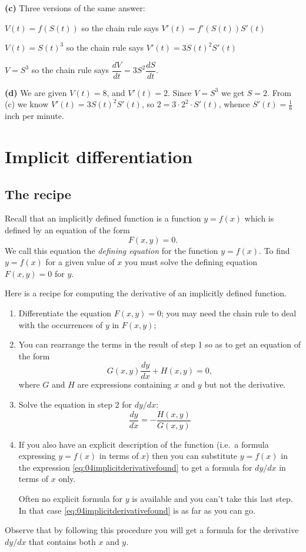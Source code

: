 \begin{multicols}{2}
\textbf{(c)} Three versions of the same answer:

$V(t) = f(S(t))$ so the chain rule says $V'(t) = f'(S(t)) S'(t)$

$V(t) = S(t)^3$ so the chain rule says $V'(t) = 3S(t)^2 S'(t)$

$V=S^3$ so the chain rule says $\dfrac{dV}{dt} =
3S^2\dfrac{dS}{dt}$.

\textbf{(d)} We are given $V(t) = 8$, and $V'(t)=2$.  Since $V=S^3$
we get $S=2$.  From (c) we know $V'(t)=3S(t)^2 S'(t)$, so $2 =
3\cdot 2^2\cdot S'(t)$, whence $S'(t) = \frac16$ inch per minute.
\endanswer
\end{multicols}
\noproblemfont

\section{Implicit differentiation}
\label{sec:implicit-differentiation}
\subsection{The recipe}
Recall that an implicitly defined function is a function $y=f(x)$
which is defined by an equation of the form
\[
F(x, y) = 0.
\]
We call this equation the \emph{defining equation} for the function
$y=f(x)$.  To find $y=f(x)$ for a given value of $x$ you must solve
the defining equation $F(x, y)=0$ for $y$.

Here is a recipe for computing the derivative of an implicitly defined
function.
\begin{enumerate}
\item Differentiate the equation $F(x, y)=0$; you may need the chain
  rule to deal with the occurrences of $y$ in $F(x, y)$;

\item You can rearrange the terms in the result of step 1 so as to get
  an equation of the form
  \begin{equation}\label{eq:04imp-deriv-step2}
    G(x, y)\dfrac{dy}{dx}+H(x, y)=0,
  \end{equation}
  where $G$ and $H$ are expressions containing $x$ and $y$ but not the
  derivative.

\item Solve the equation in step 2 for ${dy}/{dx}$:
  \begin{equation}\label{eq:04implicitderivativefound}
    \frac{dy}{dx} = -\frac{H(x, y)}{G(x, y)}
  \end{equation}

\item If you also have an explicit description of the function (i.e.\
  a formula expressing $y=f(x)$ in terms of $x$) then you can
  substitute $y=f(x)$ in the expression
  \eqref{eq:04implicitderivativefound} to get a formula for $dy/dx$ in
  terms of $x$ only.

  Often no explicit formula for $y$ is available and you can't take
  this last step.  In that case \eqref {eq:04implicitderivativefound}
  is as far as you can go.
\end{enumerate}
Observe that by following this procedure you will get a formula for
the derivative ${dy}/{dx}$ that contains both $x$ and $y$.
